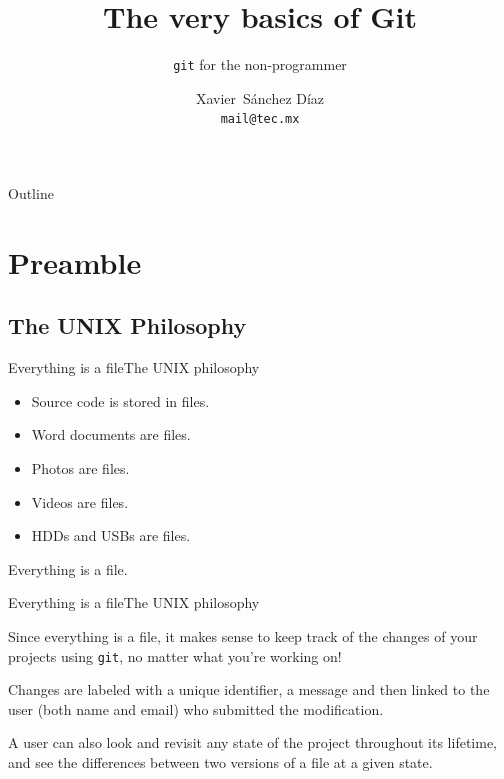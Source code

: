 \documentclass[dvipsnames, usenames]{beamer}
\title{The very basics of Git}
\subtitle{\texttt{git} for the non-programmer}
\author[X. Sánchez Díaz]{Xavier~Sánchez Díaz\\\texttt{mail@tec.mx}}
\institute[ITESM]{Research Group with Strategic Focus on Intelligent Systems\\
Tecnológico de Monterrey, Campus Monterrey}
\date{}
\newcommand{\spacepls}{\vspace{1.5Ex}}
\begin{document}
\begin{frame}
	\titlepage
\end{frame}

\begin{frame}%
	{Outline}
	\tableofcontents
\end{frame}

\section{Preamble} %
\label{sec:preamble}

\subsection{The UNIX Philosophy} %
\label{sec:philosophy}

\begin{frame}{Everything is a file}{The UNIX philosophy}

	\spacepls

	\begin{itemize}
		\item Source code is stored in files. \pause
		\item Word documents are files. \pause
		\item Photos are files. \pause
		\item Videos are files. \pause
		\item HDDs and USBs are files. \pause
	\end{itemize}

	\spacepls
	{\huge Everything \pause is \pause a \pause file.}\\
\end{frame}

\begin{frame}{Everything is a file}{The UNIX philosophy}

	\spacepls

	Since everything is a file, it makes sense to keep track of the changes of your projects using \texttt{git}, no matter what you're working on!

	Changes are labeled with a unique identifier, a message and then linked to the user (both name and email) who submitted the modification.
	
	A user can also look and revisit any state of the project throughout its lifetime, and see the differences between two versions of a file at a given state.
	
\end{frame}
\end{document}
